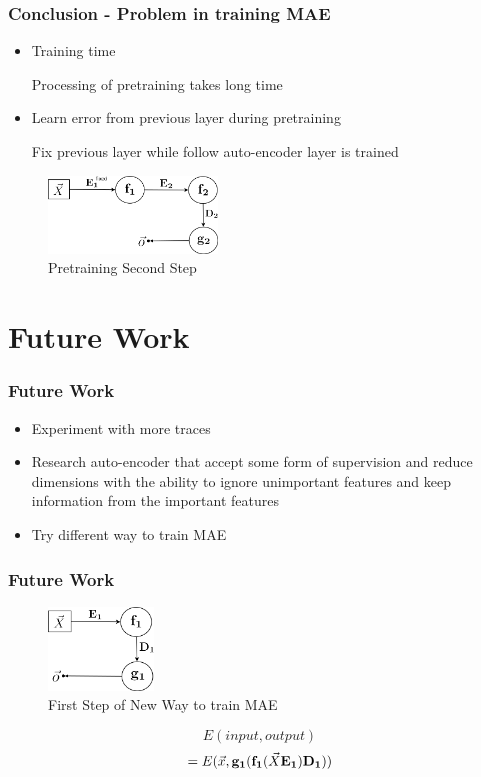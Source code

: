 \documentclass{beamer}
\begin{document}
\begin{frame}
\frametitle{Conclusion - Problem in training MAE}
\begin{itemize}
\item Training time

Processing of pretraining takes long time

\item Learn error from previous layer during pretraining

Fix previous layer while follow auto-encoder layer is trained

\end{itemize}

\begin{figure}[t!]
    \centering
    \includegraphics[width=0.4\textwidth]{../paper/pictures/figures/train_MAE2.png}
    \caption{Pretraining Second Step}
    \label{fig:train_MAE2}
\end{figure}
\end{frame}

\section{Future Work}
\begin{frame}
\frametitle{Future Work}
\begin{itemize}
\item Experiment with more traces
\item Research auto-encoder that accept some form of supervision and reduce dimensions with the ability to ignore unimportant features and keep information from the important features
\item Try different way to train MAE
\end{itemize}
\end{frame}

\begin{frame}
\frametitle{Future Work}
\begin{figure}[t!]
    \centering
    \includegraphics[width=0.25\textwidth]{../paper/pictures/figures/train_new_MAE1.png}
    \caption{First Step of New Way to train MAE}
    \label{fig:train_NMAE1}
\end{figure}

$$E(input, output)$$
$$=E(\vec{x}, \bold{g_1}(\bold{f_1}(\vec{X}\bold{E_1})\bold{D_1}))$$
\end{frame}
\end{document}
